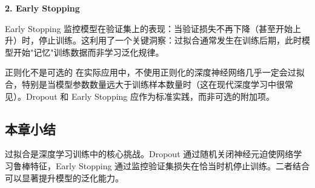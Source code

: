 \textbf{2. Early Stopping}

Early Stopping 监控模型在验证集上的表现：当验证损失不再下降（甚至开始上升）时，停止训练。这利用了一个关键洞察：过拟合通常发生在训练后期，此时模型开始"记忆"训练数据而非学习泛化规律。

\begin{warningbox}{正则化不是可选的}
在实际应用中，不使用正则化的深度神经网络几乎一定会过拟合，特别是当模型参数数量远大于训练样本数量时（这在现代深度学习中很常见）。Dropout 和 Early Stopping 应作为标准实践，而非可选的附加项。
\end{warningbox}

\subsection{本章小结}

过拟合是深度学习训练中的核心挑战。Dropout 通过随机关闭神经元迫使网络学习鲁棒特征，Early Stopping 通过监控验证集损失在恰当时机停止训练。二者结合可以显著提升模型的泛化能力。

